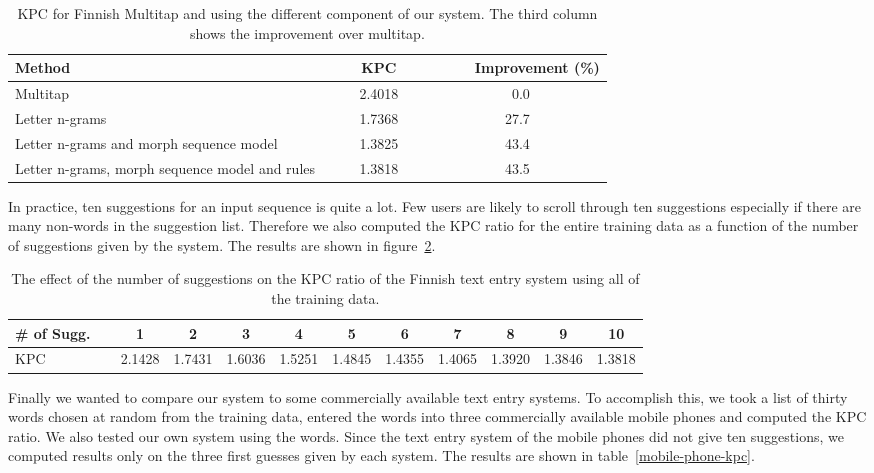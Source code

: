 \documentclass{llncs}
\begin{document}
\begin{table}
\begin{center}
\caption{KPC for Finnish Multitap and using the different component of
  our system. The third column shows the improvement over
  multitap.}\label{Finnish-kpc-table}
\begin{tabular}{lcr}
\hline
Method ~~~~& ~~~~KPC~~~~ &~~~~Improvement (\%)\\
\hline
Multitap                                       &2.4018 & 0.0~~~~~~~~~~\\
Letter n-grams                                 &1.7368 & 27.7~~~~~~~~~~\\
Letter n-grams and morph sequence model        &1.3825 & 43.4~~~~~~~~~~\\
Letter n-grams, morph sequence model and rules &1.3818 & 43.5~~~~~~~~~~\\
\hline
\end{tabular}
\end{center}
\end{table}

In practice, ten suggestions for an input sequence is quite a lot. Few
users are likely to scroll through ten suggestions especially if there
are many non-words in the suggestion list. Therefore we also computed
the KPC ratio for the entire training data as a function of the number
of suggestions given by the system. The results are shown in
figure~\ref{fi-kpc-suggestions}.

\begin{table}\label{fi-kpc-suggestions}
\caption{The effect of the number of suggestions on the KPC ratio of the Finnish text entry system using all of the training data.}
\begin{center}
\begin{tabular}{lcccccccccc}
\hline
\# of Sugg.~~&  1 & 2 & 3 & 4 & 5 & 6 & 7 & 8 & 9 & 10\\
\hline
KPC & 2.1428 & 1.7431 & 1.6036 & 1.5251 & 1.4845 & 1.4355 & 1.4065 & 1.3920 & 1.3846 & 1.3818\\
\hline
\end{tabular}
\end{center}
\end{table}

Finally we wanted to compare our system to some commercially available
text entry systems. To accomplish this, we took a list of thirty words
chosen at random from the training data, entered the words into three
commercially available mobile phones and computed the KPC ratio. We
also tested our own system using the words. Since the text entry
system of the mobile phones did not give ten suggestions, we computed
results only on the three first guesses given by each system. The
results are shown in table~\ref{mobile-phone-kpc}.
\end{document}
